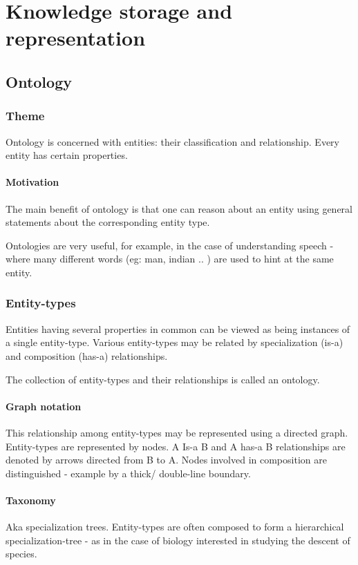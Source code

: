 \documentclass[oneside, article]{memoir}
\begin{document}
\part{Knowledge storage and representation}
\chapter{Ontology}
\section{Theme}
Ontology is concerned with entities: their classification and relationship. Every entity has certain properties.

\subsection{Motivation}
The main benefit of ontology is that one can reason about an entity using general statements about the corresponding entity type.

Ontologies are very useful, for example, in the case of understanding speech - where many different words (eg: man, indian .. ) are used to hint at the same entity.

\section{Entity-types}
Entities having several properties in common can be viewed as being instances of a single entity-type. Various entity-types may be related by specialization (is-a) and composition (has-a) relationships.

The collection of entity-types and their relationships is called an ontology.

\subsection{Graph notation}
This relationship among entity-types may be represented using a directed graph. Entity-types are represented by nodes. A Is-a B and A has-a B relationships are denoted by arrows directed from B to A. Nodes involved in composition are distinguished - example by a thick/ double-line boundary.

\subsection{Taxonomy}
Aka specialization trees. Entity-types are often composed to form a hierarchical specialization-tree - as in the case of biology interested in studying the descent of species.
\end{document}
